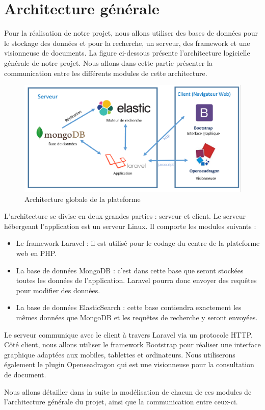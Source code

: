\newpage
\section{Architecture générale}
\label{sec:generale}

Pour la réalisation de notre projet, nous allons utiliser des bases de données pour le stockage des données et pour la recherche, un serveur, des framework et une visionneuse de documents. La figure ci-dessous présente l'architecture logicielle générale de notre projet. Nous allons dans cette partie présenter la communication entre les différents modules de cette architecture.
    \begin{figure}[H]
        \centering
        \includegraphics[width=\textwidth]{figure/Archi.png}
            \caption{Architecture globale de la plateforme}
            \label{archi}
    \end{figure}

L'architecture se divise en deux grandes parties : serveur et client. 
Le serveur hébergeant l'application est un serveur Linux. Il comporte les modules suivants :
\begin{itemize}
	\item Le framework Laravel : il est utilisé pour le codage du centre de la plateforme web en PHP.
	\item La base de données MongoDB : c'est dans cette base que seront stockées toutes les données de l'application. Laravel pourra donc envoyer des requêtes pour modifier des données.
	\item La base de données ElasticSearch : cette base contiendra exactement les mêmes données que MongoDB et les requêtes de recherche y seront envoyées.
\end{itemize}

Le serveur communique avec le client à travers Laravel via un protocole HTTP. Côté client, nous allons utiliser le framework Bootstrap pour réaliser une interface graphique adaptées aux mobiles, tablettes et ordinateurs. Nous utiliserons également le plugin Openseadragon qui est une visionneuse pour la consultation de document. 

Nous allons détailler dans la suite la modélisation de chacun de ces modules de l'architecture générale du projet, ainsi que la communication entre ceux-ci.
